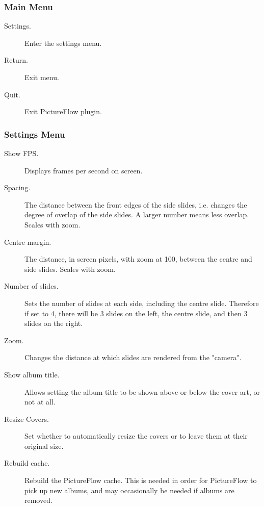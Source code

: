 \subsubsection{Main Menu}
\begin{description}
  \item[Settings.] Enter the settings menu.
  \item[Return.] Exit menu.
  \item[Quit.] Exit PictureFlow plugin.
\end{description}

\subsubsection{Settings Menu}

\begin{description}
  \item[Show FPS.] Displays frames per second on screen.
  \item[Spacing.] The distance between the front edges of the side slides, i.e. changes
  the degree of overlap of the side slides. A larger number means less overlap. Scales with zoom.
  \item[Centre margin.] The distance, in screen pixels, with zoom at 100, between
  the centre and side slides. Scales with zoom.
  \item[Number of slides.] Sets the number of slides at each side, including the
  centre slide. Therefore if set to 4, there will be 3 slides on the left,
  the centre slide, and then 3 slides on the right.
  \item[Zoom.] Changes the distance at which slides are rendered from the "camera".
  \item[Show album title.] Allows setting the album title to be shown above or
  below the cover art, or not at all.
  \item[Resize Covers.] Set whether to automatically resize the covers or to leave
  them at their original size.
  \item[Rebuild cache.] Rebuild the PictureFlow cache. This is needed in order
  for PictureFlow to pick up new albums, and may occasionally be needed if albums
  are removed.
\end{description}
